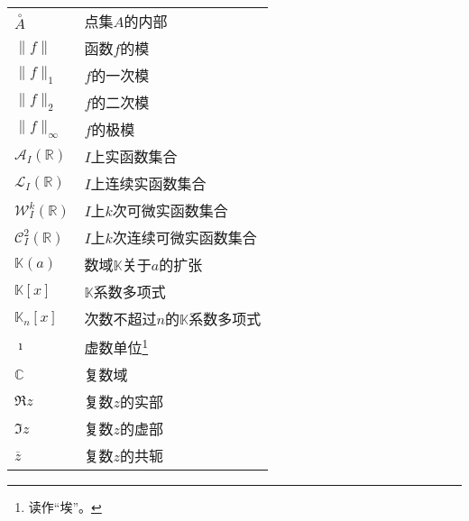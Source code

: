 \documentclass[12pt,UTF8]{article}
\begin{document}
\begin{longtable}{ m{15em} m{15em} }
    $\overset{\circ}{A}$ & 点集$A$的内部 \\
    $\|f\|$ & 函数$f$的模 \\
    $\|f\|_{1}$ & $f$的一次模 \\
    $\|f\|_{2}$ & $f$的二次模 \\
    $\|f\|_{\infty}$ & $f$的极模 \\
    $\mathcal{A}_I(\mathbb{R})$ & $I$上实函数集合 \\
    $\mathcal{L}_I(\mathbb{R})$ & $I$上连续实函数集合 \\
    $\mathcal{W}^k_I(\mathbb{R})$ & $I$上$k$次可微实函数集合 \\
    $\mathcal{C}^2_I(\mathbb{R})$ & $I$上$k$次连续可微实函数集合 \\
    $\mathbb{K}(a)$ & 数域$\mathbb{K}$关于$a$的扩张 \\
    $\mathbb{K}[x]$ & $\mathbb{K}$系数多项式 \\
    $\mathbb{K}_n[x]$ & 次数不超过$n$的$\mathbb{K}$系数多项式 \\
    $\imath$ & 虚数单位\footnote{读作“埃”。} \\
    $\mathbb{C}$ & 复数域 \\
    $\Re{z}$ & 复数$z$的实部 \\
    $\Im{z}$ & 复数$z$的虚部 \\
    $\overline{z}$ & 复数$z$的共轭 \\


\end{longtable}
\end{document}
